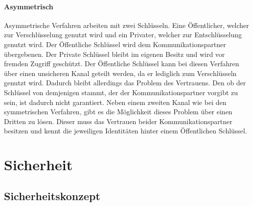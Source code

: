 \documentclass[11pt,a4paper]{report}
\begin{document}
\paragraph{Asymmetrisch}

Asymmetrische Verfahren arbeiten mit zwei Schlüsseln. Eine Öffentlicher, welcher zur Verschlüsselung genutzt wird und ein Privater, welcher zur Entschlüsselung genutzt wird. Der Öffentliche Schlüssel wird dem Kommunikationspartner übergebenen. Der Private Schlüssel bleibt im eigenen Besitz und wird vor fremden Zugriff geschützt. Der Öffentliche Schlüssel kann bei diesen Verfahren über einen unsicheren Kanal geteilt werden, da er lediglich zum Verschlüsseln genutzt wird. Dadurch bleibt allerdings das Problem des Vertrauens. Den ob der Schlüssel von demjenigen stammt, der der Kommunikationspartner vorgibt zu sein, ist dadurch nicht garantiert. Neben einem zweiten Kanal wie bei den symmetrischen Verfahren, gibt es die Möglichkeit dieses Problem über einen Dritten zu lösen. Dieser muss das Vertrauen beider Kommunikationspartner besitzen und kennt die jeweiligen Identitäten hinter einem Öffentlichen Schlüssel.

\section{Sicherheit}

\subsection{Sicherheitskonzept} \label{sec:security_conzept}
\end{document}
